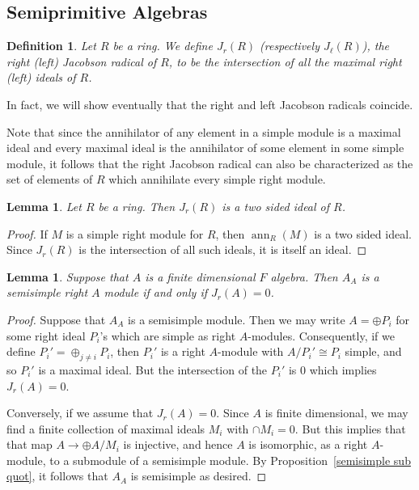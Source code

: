 \documentclass[12pt]{report}
\theoremstyle{plain}
\newtheorem{defn}[thm]{Definition}
\newtheorem{lem}[thm]{Lemma}
\newcommand{\oper}[1]{\operatorname{#1}}
\newcommand{\ann}{\oper{ann}}
\newcommand{\X}[1]{#1\index{#1}}
\begin{document}
\subsection{Semiprimitive Algebras}

\begin{defn} 
Let $R$ be a ring. We define $J_r(R)$ (respectively $J_\ell(R)$), the right
(left) \X{Jacobson radical} of $R$, to be the intersection of all the maximal
right (left) ideals of $R$. 
\end{defn}
In fact, we will show eventually that the right and left Jacobson radicals
coincide.

Note that since the annihilator of any element in a simple module is a
maximal ideal and every maximal ideal is the annihilator of some element in
some simple module, it follows that the right Jacobson radical can also be
characterized as the set of elements of $R$ which annihilate every simple
right module.

\begin{lem}
Let $R$ be a ring. Then $J_r(R)$ is a two sided ideal of $R$.
\end{lem}
\begin{proof}
If $M$ is a simple right module for $R$, then $\ann_R(M)$ is a two sided
ideal. Since $J_r(R)$ is the intersection of all such ideals, it is itself
an ideal.
\end{proof}

\begin{lem}
Suppose that $A$ is a finite dimensional $F$ algebra. Then $A_A$ is a
semisimple right $A$ module if and only if $J_r(A) = 0$.
\end{lem}
\begin{proof}
Suppose that $A_A$ is a semisimple module. Then we may write $A = \oplus
P_i$ for some right ideal $P_i$'s which are simple as right $A$-modules.
Consequently, if we define $P_i' = \oplus_{j \neq i} P_i$, then $P_i'$ is a
right $A$-module with $A/P_i' \cong P_i$ simple, and so $P_i'$ is a maximal
ideal. But the intersection of the $P_i'$ is $0$ which implies $J_r(A) =
0$.

Conversely, if we assume that $J_r(A) = 0$. Since $A$ is finite
dimensional, we may find a finite collection of maximal ideals $M_i$ with
$\cap M_i = 0$. But this implies that that map $A \to \oplus A/M_i$ is
injective, and hence $A$ is isomorphic, as a right $A$-module, to a
submodule of a semisimple module. By Proposition~\ref{semisimple sub quot},
it follows that $A_A$ is semisimple as desired. 
\end{proof}
\end{document}
